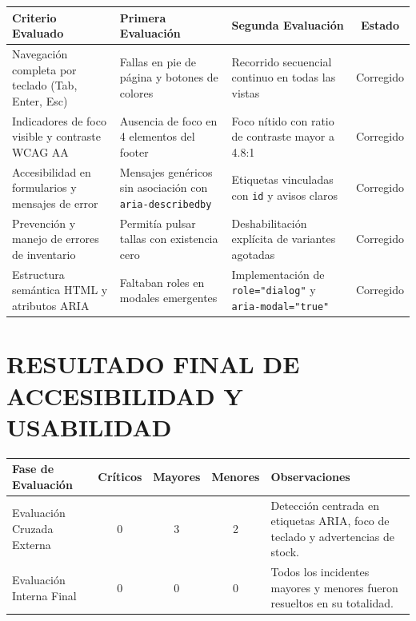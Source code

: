 \documentclass[12pt]{article}
\begin{document}
\begin{table}[H]
\centering
\small
\renewcommand{\arraystretch}{1.3}
\begin{tabularx}{\textwidth}{|X|p{3.2cm}|p{3.2cm}|c|}
\hline
\textbf{Criterio Evaluado} & \textbf{Primera Evaluación} & \textbf{Segunda Evaluación} & \textbf{Estado} \\ \hline
Navegación completa por teclado (Tab, Enter, Esc) & Fallas en pie de página y botones de colores & Recorrido secuencial continuo en todas las vistas & Corregido \\ \hline
Indicadores de foco visible y contraste WCAG AA & Ausencia de foco en 4 elementos del footer & Foco nítido con ratio de contraste mayor a 4.8:1 & Corregido \\ \hline
Accesibilidad en formularios y mensajes de error & Mensajes genéricos sin asociación con \texttt{aria-describedby} & Etiquetas vinculadas con \texttt{id} y avisos claros & Corregido \\ \hline
Prevención y manejo de errores de inventario & Permitía pulsar tallas con existencia cero & Deshabilitación explícita de variantes agotadas & Corregido \\ \hline
Estructura semántica HTML y atributos ARIA & Faltaban roles en modales emergentes & Implementación de \texttt{role="dialog"} y \texttt{aria-modal="true"} & Corregido \\ \hline
\end{tabularx}
\end{table}

\section*{RESULTADO FINAL DE ACCESIBILIDAD Y USABILIDAD}

\begin{table}[H]
\centering
\small
\renewcommand{\arraystretch}{1.3}
\begin{tabularx}{\textwidth}{|X|c|c|c|X|}
\hline
\textbf{Fase de Evaluación} & \textbf{Críticos} & \textbf{Mayores} & \textbf{Menores} & \textbf{Observaciones} \\ \hline
Evaluación Cruzada Externa & 0 & 3 & 2 & Detección centrada en etiquetas ARIA, foco de teclado y advertencias de stock. \\ \hline
Evaluación Interna Final & 0 & 0 & 0 & Todos los incidentes mayores y menores fueron resueltos en su totalidad. \\ \hline
\end{tabularx}
\end{table}
\end{document}
